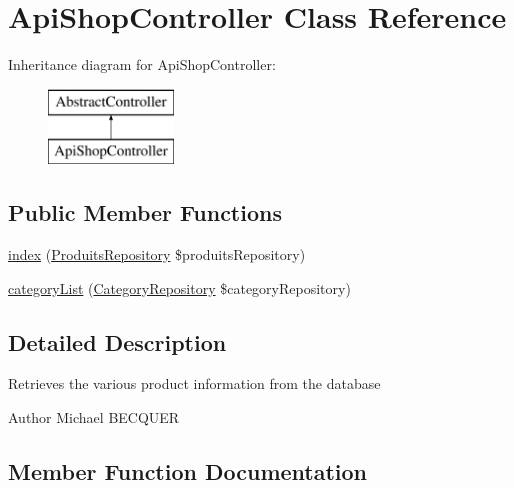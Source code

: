 \hypertarget{class_app_1_1_controller_1_1_api_shop_controller}{}\section{Api\+Shop\+Controller Class Reference}
\label{class_app_1_1_controller_1_1_api_shop_controller}
Inheritance diagram for Api\+Shop\+Controller\+:\begin{figure}[H]
\begin{center}
\leavevmode
\includegraphics[height=2.000000cm]{class_app_1_1_controller_1_1_api_shop_controller}
\end{center}
\end{figure}
\subsection*{Public Member Functions}
\begin{DoxyCompactItemize}
\item 
\mbox{\hyperlink{class_app_1_1_controller_1_1_api_shop_controller_a4b18c8720ede9d5ce2beda028d675d13}{index}} (\mbox{\hyperlink{class_app_1_1_repository_1_1_produits_repository}{Produits\+Repository}} \$produits\+Repository)
\item 
\mbox{\hyperlink{class_app_1_1_controller_1_1_api_shop_controller_aa17be29d9a8068e407db7d0db06bde6d}{category\+List}} (\mbox{\hyperlink{class_app_1_1_repository_1_1_category_repository}{Category\+Repository}} \$category\+Repository)
\end{DoxyCompactItemize}


\subsection{Detailed Description}
Retrieves the various product information from the database \begin{DoxyAuthor}{Author}
Michael B\+E\+C\+Q\+U\+ER 
\end{DoxyAuthor}


\subsection{Member Function Documentation}
\mbox{\label{class_app_1_1_controller_1_1_api_shop_controller_aa17be29d9a8068e407db7d0db06bde6d}} 

